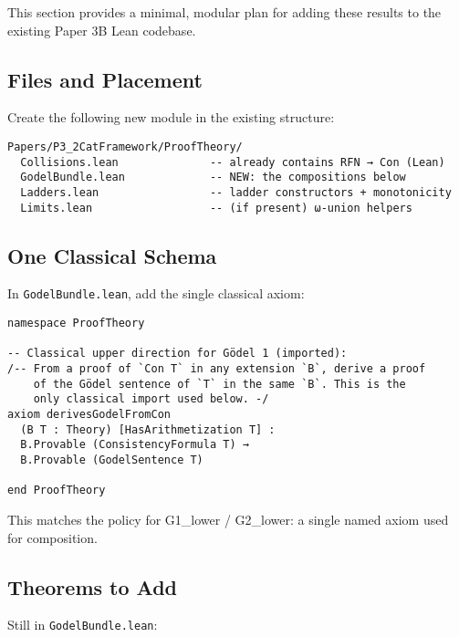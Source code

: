 \documentclass[11pt]{article}
\begin{document}
This section provides a minimal, modular plan for adding these results to the existing Paper 3B Lean codebase.

\subsection{Files and Placement}

Create the following new module in the existing structure:

\begin{verbatim}
Papers/P3_2CatFramework/ProofTheory/
  Collisions.lean              -- already contains RFN → Con (Lean)
  GodelBundle.lean             -- NEW: the compositions below
  Ladders.lean                 -- ladder constructors + monotonicity
  Limits.lean                  -- (if present) ω-union helpers
\end{verbatim}

\subsection{One Classical Schema}

In \texttt{GodelBundle.lean}, add the single classical axiom:

\begin{lstlisting}[language=Lean]
namespace ProofTheory

-- Classical upper direction for Gödel 1 (imported):
/-- From a proof of `Con T` in any extension `B`, derive a proof 
    of the Gödel sentence of `T` in the same `B`. This is the 
    only classical import used below. -/
axiom derivesGodelFromCon
  (B T : Theory) [HasArithmetization T] :
  B.Provable (ConsistencyFormula T) → 
  B.Provable (GodelSentence T)

end ProofTheory
\end{lstlisting}

This matches the policy for G1\_lower / G2\_lower: a single named axiom used for composition.

\subsection{Theorems to Add}

Still in \texttt{GodelBundle.lean}:
\end{document}
